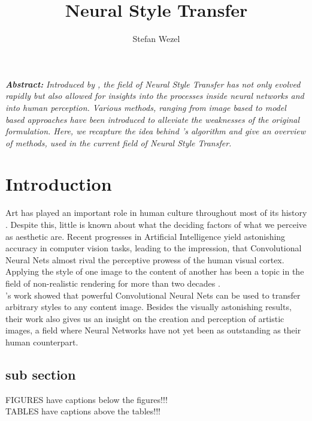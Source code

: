\documentclass{seminar}
\begin{document}
	\renewcommand\toptitle{Seminar: ,,Current Topics in Deep Neural Networks``}
	\title{Neural Style Transfer}
	\author{Stefan Wezel}
	\maketitle
	
	
	\addvspace{0.5cm}
	\emph{\bfseries{Abstract:}}
	\emph{Introduced by \cite{gatys2015neural}, the field of Neural Style Transfer has not only evolved rapidly but also allowed for insights into the processes inside neural networks and into human perception. Various methods, ranging from image based to model based approaches have been introduced to alleviate the weaknesses of the original formulation. Here, we recapture the idea behind \cite{gatys2015neural}'s algorithm and give an overview of methods, used in the current field of Neural Style Transfer.}
	
	
	\tableofcontents
	\newpage
	
	\section{Introduction}
	Art has played an important role in human culture throughout most of its history \cite{carroll2004art}. Despite this, little is known about what the deciding factors of what we perceive as aesthetic are. Recent progresses in Artificial Intelligence yield astonishing accuracy in computer vision tasks, leading to the impression, that Convolutional Neural Nets almost rival the perceptive prowess of the human visual cortex.
	\\ 
	Applying the style of one image to the content of another has been a topic in the field of non-realistic rendering for more than two decades \cite{jing2019neural}.
	\\
	\cite{gatys2015neural}'s work showed that powerful Convolutional Neural Nets can be used to transfer arbitrary styles to any content image. Besides the visually astonishing results, their work also gives us an insight on the creation and perception of artistic images, a field where Neural Networks have not yet been as outstanding as their human counterpart.\\
	
	
	
	
	
	\subsection{sub section}
	FIGURES have captions below the figures!!!\\
	TABLES have captions above the tables!!!\\
	
\end{document}
